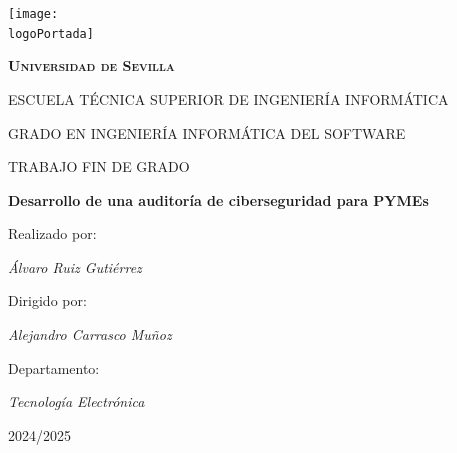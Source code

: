 \documentclass[a4paper, 11pt]{article}
\newcommand{\logoPortada}{images/logo_uni.png}
\begin{document}
    \begin{titlepage}
        \centering
        \texttt{[image: \\logoPortada]} \par\vspace{1cm}
        {\scshape\LARGE \textbf{Universidad de Sevilla}}\par\vspace{1cm}
        {\scshape\Large ESCUELA TÉCNICA SUPERIOR DE INGENIERÍA INFORMÁTICA}\par\vspace{1cm}
        GRADO EN INGENIERÍA INFORMÁTICA DEL SOFTWARE\par\vspace{1cm}
        TRABAJO FIN DE GRADO\par\vspace{1cm}
        {\huge\bfseries Desarrollo de una auditoría de ciberseguridad para PYMEs}\par\vspace{1cm}
        Realizado por:\par\vspace{0.1cm}
        {\Large\itshape Álvaro Ruiz Gutiérrez}\par\vspace{1cm}
        Dirigido por:\par\vspace{0.1cm}
        {\Large\itshape Alejandro Carrasco Muñoz}\par\vspace{1cm}
        Departamento:\par\vspace{0.1cm}
        {\Large\itshape Tecnología Electrónica}\par\vspace{1cm}
        2024/2025
    \end{titlepage}
    \clearpage

\tableofcontents
\thispagestyle{empty}
\clearpage


\listoffigures
\thispagestyle{empty}
\clearpage


\listoftables
\thispagestyle{empty}
\clearpage

\renewcommand{\lstlistlistingname}{Índice de códigos}
\lstlistoflistings
\thispagestyle{empty}
\clearpage
\end{document}
